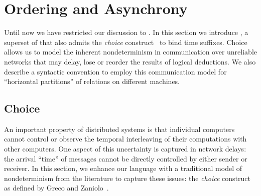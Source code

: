 \section{Ordering and Asynchrony}
\label{sec:async}

%    

Until now we have restricted our discussion to \slang.  In this section we
introduce \lang, a superset of \slang that also admits the \emph{choice} construct~\cite{greedychoice} to bind time suffixes.
Choice allows us to model the inherent nondeterminism in communication over unreliable
networks that may delay, lose or reorder the results of logical deductions. 
We also describe a syntactic convention to employ this communication model for ``horizontal partitions'' of relations on different machines.


\subsection{Choice}



An important property of distributed systems is that individual computers cannot control or observe the temporal interleaving of their computations with other computers.  One aspect of this uncertainty is captured in network delays: the arrival ``time'' of messages cannot be directly controlled by either sender or receiver.  In this section, we enhance our language with a traditional model of nondeterminism from the literature to capture these issues: the \emph{choice} construct as defined by Greco and Zaniolo~\cite{greedychoice}.

